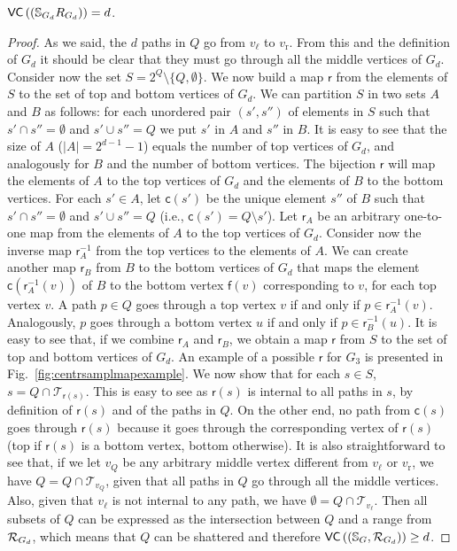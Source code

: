 \begin{lemma}\label{lem:vcdimlowbound}
  $\mathsf{VC}\left((\mathbb{S}_{G_d}R_{G_d})\right)=d$.
\end{lemma}
\begin{proof}
  As we said, the $d$ paths in $Q$  go from $v_\ell$ to $v_\mathrm{r}$.
  From this and the definition of $G_d$ it should be clear that they must go through
  all the middle vertices of $G_d$. Consider now the set
  $S=2^Q\setminus\{Q,\emptyset\}$. We now build a map $\mathsf{r}$
  from the elements of $S$ to the set of top and bottom vertices of $G_d$. We can
  partition $S$ in two sets $A$ and $B$ as follows: %
  for each unordered pair $(s',s'')$ of
  elements in $S$ such that $s'\cap s''=\emptyset$ and $s'\cup s''=Q$
  we put $s'$ in $A$ and $s''$ in $B$. It is
  easy to see that the size of $A$ ($|A|=2^{d-1}-1$) equals the number of top
  vertices of $G_d$, and analogously for $B$ and the number of bottom vertices.
  The bijection $\mathsf{r}$ will map the
  elements of $A$ to the top vertices of $G_d$ and the elements of $B$ to the
  bottom vertices. For each $s'\in A$, let $\mathsf{c}(s')$ be the unique element $s''$
  of $B$ such that $s'\cap s''=\emptyset$ and $s'\cup s''=Q$ (i.e.,
  $\mathsf{c}(s')=Q\setminus s'$). 
  Let $\mathsf{r}_A$ be an arbitrary one-to-one map from the elements of $A$ to
  the top vertices of $G_d$. Consider now the inverse map $\mathsf{r}^{-1}_A$
  from the top vertices to the elements of $A$. We can create another map
  $\mathsf{r}_B$ from $B$ to the
  bottom vertices of $G_d$ that maps the element
  $\mathsf{c}(\mathsf{r}^{-1}_A(v))$ of $B$ to the bottom vertex $\mathsf{f}(v)$
  corresponding to $v$, for each top vertex $v$. A path $p\in Q$ goes through
  a top vertex $v$ if and only if $p\in\mathsf{r}^{-1}_A(v)$. Analogously, $p$
  goes through a bottom vertex $u$ if and only if $p\in\mathsf{r}^{-1}_B(u)$.
  It is easy to see that, if we combine $\mathsf{r}_A$ and
  $\mathsf{r}_B$, we obtain a map $\mathsf{r}$ from $S$ to the set of
  top and bottom vertices of $G_d$. An example of a possible $\mathsf{r}$ for
  $G_3$ is presented in Fig.~\ref{fig:centrsamplmapexample}.
  We now show that for each $s\in S$, $s=Q\cap\mathcal{T}_{\mathsf{r}(s)}$. This
  is easy to see as $\mathsf{r}(s)$ is internal to all paths in $s$, by
  definition of $\mathsf{r}(s)$ and of the paths in $Q$. On the other end, no
  path from $\mathsf{c}(s)$ goes through $\mathsf{r}(s)$ because it goes through
  the corresponding vertex of $\mathsf{r}(s)$ (top if $\mathsf{r}(s)$ is a
  bottom vertex, bottom otherwise). It is also straightforward to see that,
  if we let $v_Q$ be any arbitrary middle vertex different from $v_\ell$
  or $v_\mathrm{r}$, we have $Q=Q\cap\mathcal{T}_{v_Q}$, given that all paths in
  $Q$ go through all the middle vertices. Also, given that $v_\ell$ is not
  internal to any path, we have $\emptyset=Q\cap\mathcal{T}_{v_\ell}$. Then all
  subsets of $Q$ can be expressed as the intersection between $Q$ and a range
  from $\mathcal{R}_{G_d}$, which means that $Q$ can be shattered and therefore
  $\mathsf{VC}\left((\mathbb{S}_G,\mathcal{R}_{G_d})\right)\ge d$.


\end{proof}

